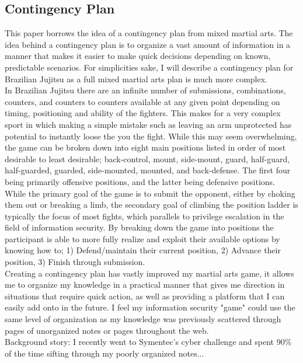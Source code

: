 \documentclass{article}
\begin{document}
\subsection{Contingency Plan}
This paper borrows the idea of a contingency plan from mixed martial arts. The idea behind a contingency plan is to organize a vast amount of information in a manner that makes it easier to make quick decisions depending on known, predictable scenarios. For simplicities sake, I will describe a contingency plan for Brazilian Jujitsu as a full mixed martial arts plan is much more complex.\\
In Brazilian Jujitsu there are an infinite number of submissions, combinations, counters, and counters to counters available at any given point depending on timing, positioning and ability of the fighters. This makes for a very complex sport in which making a simple mistake such as leaving an arm unprotected has potential to instantly loose the you the fight. While this may seem overwhelming, the game can be broken down into eight main positions listed in order of most desirable to least desirable; back-control, mount, side-mount, guard, half-guard, half-guarded, guarded, side-mounted, mounted, and back-defense. The first four being primarily offensive positions, and the latter being defensive positions.\\
While the primary goal of the game is to submit the opponent, either by choking them out or breaking a limb, the secondary goal of climbing the position ladder is typically the focus of most fights, which parallels to privilege escalation in the field of information security. By breaking down the game into positions the participant is able to more fully realize and exploit their available options by knowing how to; 1) Defend/maintain their current position, 2) Advance their position, 3)  Finish through submission. \\
Creating a contingency plan has vastly improved my martial arts game, it allows me to organize my knowledge in a practical manner that gives me direction in situations that require quick action, as well as providing a platform that I can easily add onto in the future. I feel my information security "game" could use the same level of organization as my knowledge was previously scattered through pages of unorganized notes or pages throughout the web.\\ Background story: I recently went to Symentec's cyber challenge and spent 90\% of the time sifting through my poorly organized notes...\\
\end{document}

